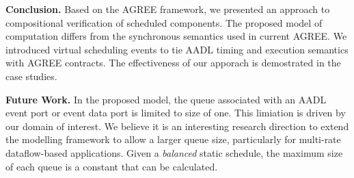 {\bf Conclusion.}
Based on the AGREE framework, we presented an approach to compositional verification of scheduled components. The proposed model of computation differs from the synchronous semantics used in current AGREE. We introduced virtual scheduling events to tie AADL timing and execution semantics with AGREE contracts. The effectiveness of our apporach is demostrated in the case studies.

{\bf Future Work.}
In the proposed model, the queue associated with an AADL event port or event data port is limited to size of one. This limiation is driven by our domain of interest. We believe it is an interesting research direction to extend the modelling framework to allow a larger queue size, particularly for multi-rate dataflow-based applications. Given a \emph{balanced} static schedule, the maximum size of each queue is a constant that can be calculated.

